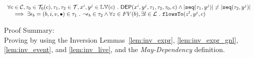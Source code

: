\begin{lem}
	\label{lem:diffctl_inv}
	\[
		\begin{array}{l}
			\forall c \in \mathcal{C}, \mathtt{\tau}_0 \in \mathcal{T}_0(c), \mathtt{\tau}_1, \mathtt{\tau}_2 \in \mathcal{T}, x^i, y^j \in \mathbb{LV}(c) ~.~   
		\mathsf{DEP}(x^i, y^j, \mathtt{\tau}_1, \mathtt{\tau}_2 , \mathtt{\tau}_0, c) \land
		|\mathtt{seq}(\mathtt{\tau}_1, y^j)| \neq |\mathtt{seq}(\mathtt{\tau}_2, y^j)|
		\\ \quad  \implies
		\exists \mathtt{\epsilon}_b = (b, i, v, \bullet) \in \mathtt{\tau}_1 ~.~   \neg \mathtt{\epsilon}_b \in \mathtt{\tau}_2
		\land 
		\forall z \in FV(b), \exists l \in \mathcal{L} ~.~   \mathtt{flowsTo}(z^l, y^j, c)
	\end{array}
	\]
\end{lem} 
Proof Summary:
\\
Proving by using the Inversion Lemmas~\ref{lem:inv_expr}, \ref{lem:inv_expr_gnl}, 
\ref{lem:inv_event}, and \ref{lem:inv_live}, and the \emph{May-Dependency} definition.
%
